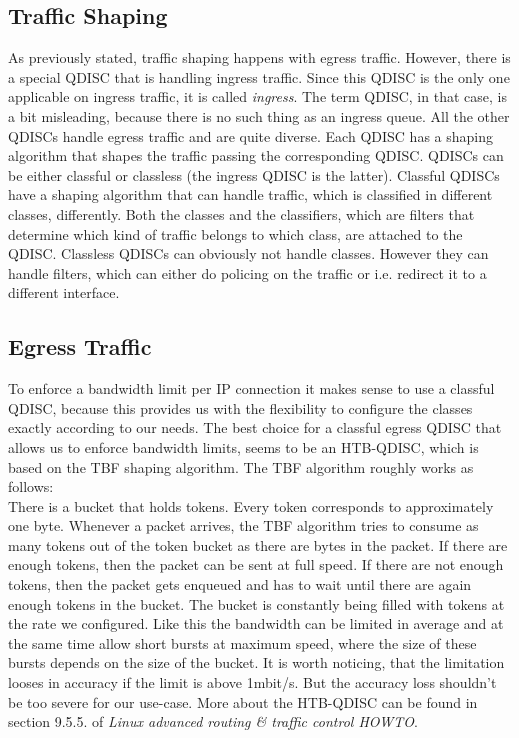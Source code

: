 \subsection{Traffic Shaping}
As previously stated, traffic shaping happens with egress traffic. However, there is a special \acs{QDISC} that is handling ingress traffic. Since this \acs{QDISC} is the only one applicable on ingress traffic, it is called \textit{ingress}. The term \acl{QDISC}, in that case, is a bit misleading, because there is no such thing as an ingress queue. All the other \acsp{QDISC} handle egress traffic and are quite diverse. Each \acs{QDISC} has a shaping algorithm that shapes the traffic passing the corresponding \acs{QDISC}. \acsp{QDISC} can be either classful or classless (the ingress \acs{QDISC} is the latter). Classful \acsp{QDISC} have a shaping algorithm that can handle traffic, which is classified in different classes, differently. Both the classes and the classifiers, which are filters that determine which kind of traffic belongs to which class, are attached to the \acs{QDISC}. Classless \acsp{QDISC} can obviously not handle classes. However they can handle filters, which can either do policing on the traffic or i.e. redirect it to a different interface.

\subsection{Egress Traffic}
To enforce a bandwidth limit per \acs{IP} connection it makes sense to use a classful \acs{QDISC}, because this provides us with the flexibility to configure the classes exactly according to our needs. The best choice for a classful egress \acs{QDISC} that allows us to enforce bandwidth limits, seems to be an \ac{HTB}-\acs{QDISC}, which is based on the \ac{TBF} shaping algorithm. The \acs{TBF} algorithm roughly works as follows: 
\\There is a bucket that holds tokens. Every token corresponds to approximately one byte. Whenever a packet arrives, the \acs{TBF} algorithm tries to consume as many tokens out of the token bucket as there are bytes in the packet. If there are enough tokens, then the packet can be sent at full speed. If there are not enough tokens, then the packet gets enqueued and has to wait until there are again enough tokens in the bucket. The bucket is constantly being filled with tokens at the rate we configured. Like this the bandwidth can be limited in average and at the same time allow short bursts at maximum speed, where the size of these bursts depends on the size of the bucket. It is worth noticing, that the limitation looses in accuracy if the limit is above 1mbit/s. But the accuracy loss shouldn't be too severe for our use-case.
More about the \acs{HTB}-\acs{QDISC} can be found in section 9.5.5. of \textit{Linux advanced routing \& traffic control HOWTO}\cite{hubert2002linux}.

